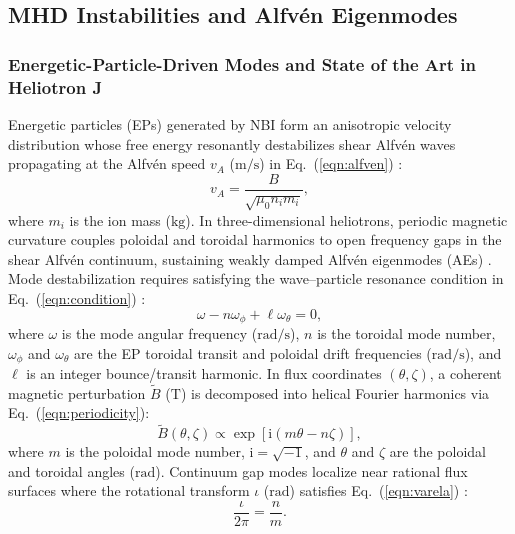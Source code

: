 \subsection{MHD Instabilities and Alfv\'en Eigenmodes}

\subsubsection{Energetic-Particle-Driven Modes and State of the Art in Heliotron J}
Energetic particles (EPs) generated by NBI form an anisotropic velocity distribution whose free energy resonantly destabilizes shear Alfv\'en waves propagating at the Alfv\'en speed $v_A$ ($\mathrm{m/s}$) in Eq.~(\ref{eqn:alfven}) \cite{Heidbrink2008, Sheikh2023, Adulsiriswad_2024, Varela2015, chen2016introduction}:
\begin{equation}
\label{eqn:alfven}
v_A = \frac{B}{\sqrt{\mu_0 n_i m_i}},
\end{equation}
\noindent where $m_i$ is the ion mass ($\mathrm{kg}$). In three-dimensional heliotrons, periodic magnetic curvature couples poloidal and toroidal harmonics to open frequency gaps in the shear Alfv\'en continuum, sustaining weakly damped Alfv\'en eigenmodes (AEs) \cite{Varela2015, Adulsiriswad_2024}. Mode destabilization requires satisfying the wave--particle resonance condition in Eq.~(\ref{eqn:condition}) \cite{Adulsiriswad_2024}:
\begin{equation}
\label{eqn:condition}
\omega - n\omega_\phi + \ell\omega_\theta = 0,
\end{equation}
\noindent where $\omega$ is the mode angular frequency ($\mathrm{rad/s}$), $n$ is the toroidal mode number, $\omega_\phi$ and $\omega_\theta$ are the EP toroidal transit and poloidal drift frequencies ($\mathrm{rad/s}$), and $\ell$ is an integer bounce/transit harmonic. In flux coordinates $(\theta, \zeta)$, a coherent magnetic perturbation $\tilde{B}$ ($\mathrm{T}$) is decomposed into helical Fourier harmonics via Eq.~(\ref{eqn:periodicity}):
\begin{equation}
\label{eqn:periodicity}    
\tilde{B}(\theta, \zeta) \propto \exp\left[\mathrm{i}(m\theta - n\zeta)\right],
\end{equation}
\noindent where $m$ is the poloidal mode number, $\mathrm{i} = \sqrt{-1}$, and $\theta$ and $\zeta$ are the poloidal and toroidal angles ($\mathrm{rad}$). Continuum gap modes localize near rational flux surfaces where the rotational transform $\iota$ ($\mathrm{rad}$) satisfies Eq.~(\ref{eqn:varela}) \cite{Varela2015}:
\begin{equation}
\label{eqn:varela}
    \frac{\iota}{2\pi} = \frac{n}{m}.
\end{equation}

